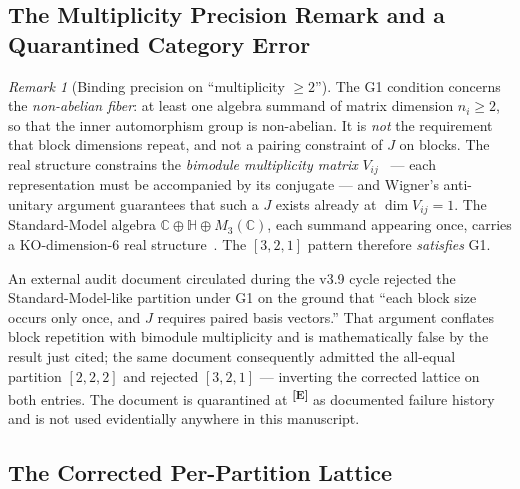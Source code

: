 \documentclass[12pt,a4paper,twoside]{article}
\theoremstyle{plain}
\theoremstyle{definition}
\theoremstyle{remark}
\newtheorem{remark}[theorem]{Remark}
\newcommand{\catmark}[1]{\textsuperscript{\textsf{\textbf{[#1]}}}}
\begin{document}
\subsection{The Multiplicity Precision Remark and a Quarantined Category Error}
\label{subsec:multiplicity-precision}

\begin{remark}[Binding precision on ``multiplicity $\geq 2$'']
\label{rem:multiplicity}
The G1 condition concerns the \emph{non-abelian fiber}: at least one
algebra summand of matrix dimension $n_i \geq 2$, so that the inner
automorphism group is non-abelian. It is \emph{not} the requirement that
block dimensions repeat, and not a pairing constraint of $J$ on blocks.
The real structure constrains the \emph{bimodule multiplicity matrix}
$V_{ij}$~\cite{krajewski1998,paschkesitarz1998,cacic2011} --- each representation must be accompanied by its conjugate ---
and Wigner's anti-unitary argument guarantees that such a $J$ exists
already at $\dim V_{ij} = 1$. The Standard-Model algebra
$\mathbb C \oplus \mathbb H \oplus M_3(\mathbb C)$, each summand appearing
once, carries a KO-dimension-6 real structure~\cite{ccm2007,vansuijlekom2019}. The $[3,2,1]$ pattern
therefore \emph{satisfies} G1.
\end{remark}

An external audit document circulated during the v3.9 cycle rejected the
Standard-Model-like partition under G1 on the ground that ``each block
size occurs only once, and $J$ requires paired basis vectors.'' That
argument conflates block repetition with bimodule multiplicity and is
mathematically false by the result just cited; the same document
consequently admitted the all-equal partition $[2,2,2]$ and rejected
$[3,2,1]$ --- inverting the corrected lattice on both entries. The
document is quarantined at \catmark{E} as documented failure history and
is not used evidentially anywhere in this manuscript.

\subsection{The Corrected Per-Partition Lattice}
\label{subsec:corrected-lattice}
\end{document}
